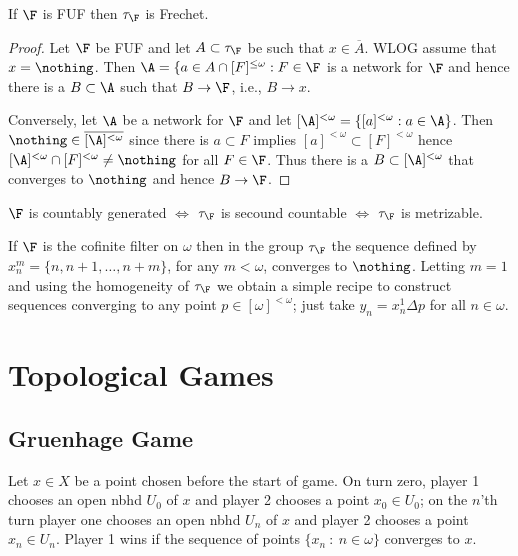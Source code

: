 \documentclass{article}
\begin{document}
\begin{prop}
    If \(\F\) is FUF then \(\tau_{\F}\) is Frechet.
\end{prop}
\begin{proof}
    Let \(\F\) be FUF and let \(A \subset \tau_{\F}\) be such that \(x \in \overline{A}\). WLOG assume that \(x = \nothing\). Then \(\A = \{a \in A \cap [F]^{\leq\omega}: F \in \F\) is a network for \(\F\) and hence there is a \(B \subset \A\) such that \(B \to \F\), i.e., \(B \to x\).

    Conversely, let \(\A\) be a network for \(\F\) and let \([\A]^{<\omega} = \{[a]^{<\omega}:a \in \A\}\). Then \(\nothing \in \overline{[\A]^{<\omega}}\) since there is \(a \subset F\) implies \([a]^{<\omega} \subset [F]^{<\omega}\) hence \([\A]^{<\omega}\cap [F]^{<\omega}\neq \nothing\) for all \(F \in \F\). Thus there is a \(B \subset [\A]^{<\omega} \) that converges to \(\nothing\) and hence \(B \to \F\).
\end{proof}
\begin{prop}
    \(\F\) is countably generated \(\iff\) \(\tau_{\F}\) is secound countable \(\iff\) \(\tau_{\F}\) is metrizable.
\end{prop}

\begin{exam}
    If \(\F\) is the cofinite filter on \(\omega\) then in the group \(\tau_{\F}\) the sequence defined by \(x_n^m = \{n, n + 1, \dots, n + m\}\), for any \(m < \omega\),  converges to \(\nothing\). Letting \(m = 1\) and using the homogeneity of \(\tau_{\F}\) we obtain a simple recipe to construct sequences converging to any point \(p \in [\omega]^{<\omega}\); just take \(y_n = x_n^1 \Delta p\) for all \(n \in \omega\).
\end{exam}

\section{Topological Games}
\subsection{Gruenhage Game}

Let \(x \in X\) be a point chosen before the start of game. On turn zero, player 1 chooses an open nbhd \(U_0\) of \(x\) and player 2 chooses a point \(x_0 \in U_0\); on the \(n\)'th turn player one chooses an open nbhd \(U_n\) of \(x\) and player 2 chooses a point \(x_n \in U_n\). Player 1 wins if the sequence of points \(\{x_n \: : \: n \in \omega\}\) converges to \(x\).
\end{document}

